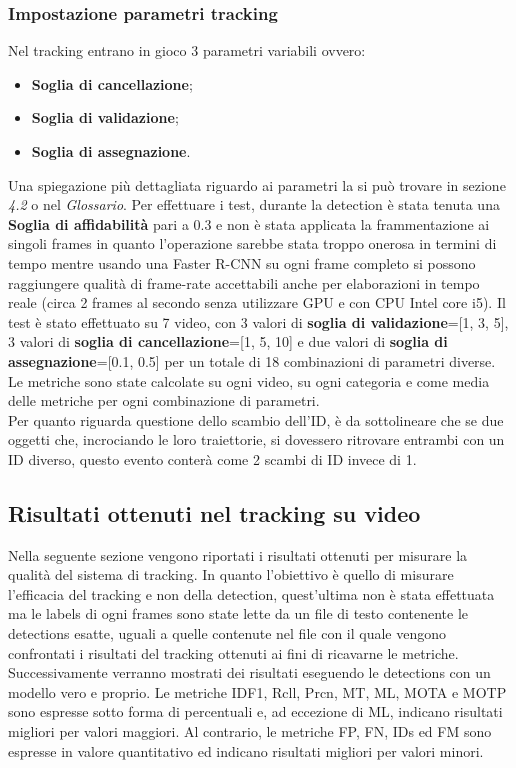 \subsubsection{Impostazione parametri tracking}
Nel tracking entrano in gioco 3 parametri variabili ovvero:
\begin{itemize}
\item \textbf{Soglia di cancellazione};
\item \textbf{Soglia di validazione};
\item \textbf{Soglia di assegnazione}.
\end{itemize}
Una spiegazione più dettagliata riguardo ai parametri la si può trovare in sezione \textit{4.2} o nel \textit{Glossario}.
Per effettuare i test, durante la detection è stata tenuta una \textbf{Soglia di affidabilità} pari a 0.3 e non è stata applicata la frammentazione ai singoli frames in quanto l'operazione sarebbe stata troppo onerosa in termini di tempo mentre usando una Faster R-CNN su ogni frame completo si possono raggiungere qualità di frame-rate accettabili anche per elaborazioni in tempo reale (circa 2 frames al secondo senza utilizzare GPU e con CPU Intel core i5).
Il test è stato effettuato su 7 video, con 3 valori di \textbf{soglia di validazione}=[1, 3, 5], 3 valori di \textbf{soglia di cancellazione}=[1, 5, 10] e due valori di \textbf{soglia di assegnazione}=[0.1, 0.5] per un totale di 18 combinazioni di parametri diverse. Le metriche sono state calcolate su ogni video, su ogni categoria e come media delle metriche per ogni combinazione di parametri.\\
Per quanto riguarda questione dello scambio dell'ID, è da sottolineare che se due oggetti che, incrociando le loro traiettorie, si dovessero ritrovare entrambi con un ID diverso, questo evento conterà come 2 scambi di ID invece di 1.

\subsection{Risultati ottenuti nel tracking su video}
Nella seguente sezione vengono riportati i risultati ottenuti per misurare la qualità del sistema di tracking. In quanto l'obiettivo è quello di misurare l'efficacia del tracking e non della detection, quest'ultima non è stata effettuata ma le labels di ogni frames sono state lette da un file di testo contenente le detections esatte, uguali a quelle contenute nel file con il quale vengono confrontati i risultati del tracking ottenuti ai fini di ricavarne le metriche.\\
Successivamente verranno mostrati dei risultati eseguendo le detections con un modello vero e proprio. Le metriche IDF1, Rcll, Prcn, MT, ML, MOTA e MOTP sono espresse sotto forma di percentuali e, ad eccezione di ML, indicano risultati migliori per valori maggiori. Al contrario, le metriche FP, FN, IDs ed FM sono espresse in valore quantitativo ed indicano risultati migliori per valori minori.

